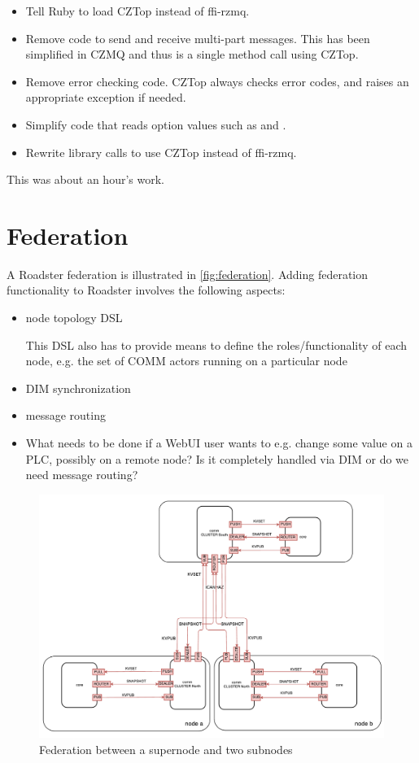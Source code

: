 \begin{itemize}
\item Tell Ruby to load CZTop instead of ffi-rzmq.
\item Remove code to send and receive multi-part messages. This has been simplified
in CZMQ and thus is a single method call using CZTop.
\item Remove error checking code. CZTop always checks error codes, and raises
an appropriate exception if needed.
\item Simplify code that reads option values such as  and .
\item Rewrite library calls to use CZTop instead of ffi-rzmq.
\end{itemize}

This was about an hour's work.

\section{Federation}\label{sec:approach:federation}
A Roadster federation is illustrated in \autoref{fig:federation}. Adding federation
functionality to Roadster involves the following aspects:
\begin{itemize}
	\item node topology DSL

		This DSL also has to provide means to define the roles/functionality of each node, e.g. the set of COMM actors running on a particular node

	\item DIM synchronization
	\item message routing
	\item What needs to be done if a WebUI user wants to e.g. change some value on a PLC, possibly on a remote node? Is it completely handled via DIM or do we need message routing?
\end{itemize}

\begin{figure}[]
	\includegraphics[width=\textwidth]{img/federation_protocol.pdf}
	\caption{Federation between a supernode and two subnodes}
	\label{fig:federation}
\end{figure}

